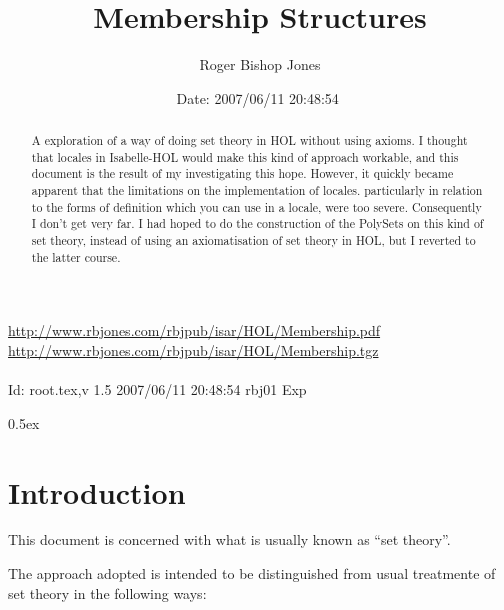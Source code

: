 \documentclass[11pt,a4paper]{article}
\begin{document}
\title{Membership Structures}
\author{Roger Bishop Jones}
\date{$ $Date: 2007/06/11 20:48:54 $ $}
\maketitle

\begin{abstract}
A exploration of a way of doing set theory in HOL without using axioms.
I thought that locales in Isabelle-HOL would make this kind of approach workable, and this document is the result of my investigating this hope.
However, it quickly became apparent that the limitations on the implementation of locales. particularly in relation to the forms of definition which you can use in a locale, were too severe.
Consequently I don't get very far.
I had hoped to do the construction of the PolySets on this kind of set theory, instead of using an axiomatisation of set theory in HOL, but I reverted to the latter course.
\end{abstract}

\vfill
\begin{centering}
{\footnotesize
\href{http://www.rbjones.com/rbjpub/isar/HOL/Membership.pdf}{http://www.rbjones.com/rbjpub/isar/HOL/Membership.pdf}\\
\href{http://www.rbjones.com/rbjpub/isar/HOL/Membership.tgz}{http://www.rbjones.com/rbjpub/isar/HOL/Membership.tgz}\\
\ \\
$ $Id: root.tex,v 1.5 2007/06/11 20:48:54 rbj01 Exp $ $\\
}%
\end{centering}

\newpage

\tableofcontents

\parindent 0pt\parskip 0.5ex

\section{Introduction}

This document is concerned with what is usually known as ``set theory''.

The approach adopted is intended to be distinguished from usual treatmente of set theory in the following ways:
\end{document}
